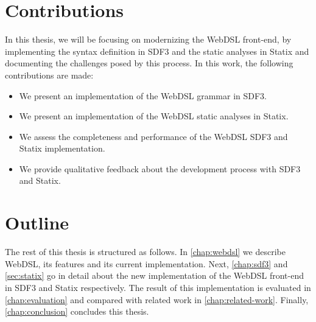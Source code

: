   \section{\label{sec:contributions}Contributions}
    In this thesis, we will be focusing on modernizing the WebDSL front-end, by implementing the syntax definition in SDF3 and the static analyses in Statix and documenting the challenges posed by this process. In this work, the following contributions are made:

    \begin{itemize}
      \item We present an implementation of the WebDSL grammar in SDF3.
      \item We present an implementation of the WebDSL static analyses in Statix.
      \item We assess the completeness and performance of the WebDSL SDF3 and Statix implementation.
      \item We provide qualitative feedback about the development process with SDF3 and Statix.
    \end{itemize}

  \section{\label{sec:outline}Outline}
    The rest of this thesis is structured as follows. In \cref{chap:webdsl} we describe WebDSL, its features and its current implementation. Next, \cref{chap:sdf3} and \cref{sec:statix} go in detail about the new implementation of the WebDSL front-end in SDF3 and Statix respectively. The result of this implementation is evaluated in \cref{chap:evaluation} and compared with related work in \cref{chap:related-work}. Finally, \cref{chap:conclusion} concludes this thesis.
